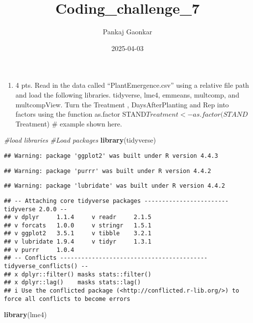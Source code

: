 \documentclass[
]{article}
\title{Coding\_challenge\_7}
\author{Pankaj Gaonkar}
\date{2025-04-03}
\newenvironment{Shaded}{\begin{snugshade}}{\end{snugshade}}
\newcommand{\CommentTok}[1]{\textcolor[rgb]{0.56,0.35,0.01}{\textit{#1}}}
\newcommand{\FunctionTok}[1]{\textcolor[rgb]{0.13,0.29,0.53}{\textbf{#1}}}
\newcommand{\NormalTok}[1]{#1}
\providecommand{\tightlist}{%
  \setlength{\itemsep}{0pt}\setlength{\parskip}{0pt}}
\begin{document}
\maketitle

{
\setcounter{tocdepth}{2}
\tableofcontents
}
\begin{enumerate}
\def\labelenumi{\arabic{enumi}.}
\tightlist
\item
  4 pts. Read in the data called ``PlantEmergence.csv'' using a relative
  file path and load the following libraries. tidyverse, lme4, emmeans,
  multcomp, and multcompView. Turn the Treatment , DaysAfterPlanting and
  Rep into factors using the function as.factor
  STAND\(Treatment <- as.factor(STAND\)Treatment) \# example shown here.
\end{enumerate}

\begin{Shaded}
\begin{Highlighting}[]
\CommentTok{\#load libraries}
\CommentTok{\#Load packages}
\FunctionTok{library}\NormalTok{(tidyverse)}
\end{Highlighting}
\end{Shaded}

\begin{verbatim}
## Warning: package 'ggplot2' was built under R version 4.4.3
\end{verbatim}

\begin{verbatim}
## Warning: package 'purrr' was built under R version 4.4.2
\end{verbatim}

\begin{verbatim}
## Warning: package 'lubridate' was built under R version 4.4.2
\end{verbatim}

\begin{verbatim}
## -- Attaching core tidyverse packages ------------------------ tidyverse 2.0.0 --
## v dplyr     1.1.4     v readr     2.1.5
## v forcats   1.0.0     v stringr   1.5.1
## v ggplot2   3.5.1     v tibble    3.2.1
## v lubridate 1.9.4     v tidyr     1.3.1
## v purrr     1.0.4     
## -- Conflicts ------------------------------------------ tidyverse_conflicts() --
## x dplyr::filter() masks stats::filter()
## x dplyr::lag()    masks stats::lag()
## i Use the conflicted package (<http://conflicted.r-lib.org/>) to force all conflicts to become errors
\end{verbatim}

\begin{Shaded}
\begin{Highlighting}[]
\FunctionTok{library}\NormalTok{(lme4)}
\end{Highlighting}
\end{Shaded}
\end{document}
